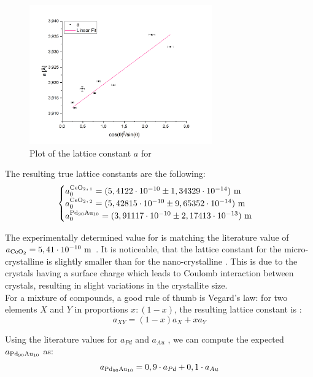 \documentclass[12pt]{article}
\begin{document}
\begin{figure}[!ht]
    \centering
    \includegraphics[width=0.7\textwidth]{2_XRD/Graphics/Experiments/Lattice Constants/LatticeConstant_Pd90Au10.png}
    \caption{Plot of the lattice constant $a$ for }
    \label{fig:LatticeConstant_Pd90Au10}
\end{figure}
\FloatBarrier

The resulting true lattice constants are the following:
\[
\begin{cases}
    a_0^{\ce{CeO2,1}} = (5,4122 \cdot 10^{-10} \pm 1,34329 \cdot 10^{-14}) \ \text{m} \\
    a_0^{\ce{CeO2,2}} = (5,42815 \cdot 10^{-10} \pm 9,65352 \cdot 10^{-14}) \ \text{m} \\
    a_0^{\ce{Pd90Au10}} = (3,91117 \cdot 10^{-10} \pm 2,17413 \cdot 10^{-13}) \ \text{m}
\end{cases}
\]

The experimentally determined value for  is matching the literature value of $a_{\ce{CeO2}} = 5,41 \cdot 10^{-10} \ \text{m}$ \cite{CeriumOxide}. It is noticeable, that the lattice constant for the micro-crystalline  is slightly smaller than for the nano-crystalline . This is due to the crystals having a surface charge which leads to Coulomb interaction between crystals, resulting in slight variations in the crystallite size. \\

For a mixture of compounds, a good rule of thumb is Vegard's law: for two elements $X$ and $Y$ in proportions $x:(1-x)$, the resulting lattice constant is \cite{VegardLaw}:
\begin{equation}
    a_{XY} = (1-x)a_X + xa_Y
\end{equation}

Using the literature values for $a_{Pd}$ and $a_{Au}$ \cite{LatticeCsts}, we can compute the expected $a_{\ce{Pd90Au10}}$ as:
\begin{equation}
    a_{\ce{Pd90Au10}} = 0,9 \cdot a_{Pd} + 0,1 \cdot a_{Au} 
\end{equation}
\end{document}
